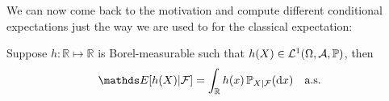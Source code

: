 We can now come back to the motivation and compute different conditional expectations just the way we are used to for the classical expectation:
\begin{lsatz}
\begin{prop}
	Suppose $h:\mathbb{R}\mapsto\mathbb{R}$ is Borel-measurable such that $h(X)\in \mathcal L^1(\Omega, \mathcal A, \P)$, then
 \begin{align*}
 	\mathds E[ h(X) |  \cF] =  \int_{\mathbb{R}} h(x)\,\P_{X|\mathcal F}(\mathrm dx)\quad\text{a.s.}
\end{align*}
\end{prop}
\end{lsatz}


